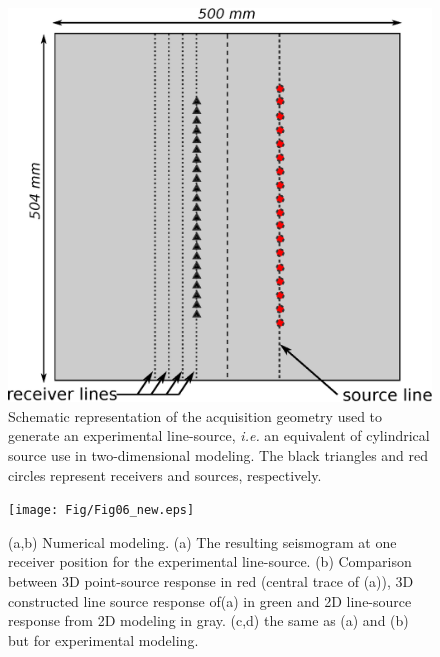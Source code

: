 \documentclass[extra,mreferee]{gji}
\newcommand{\bialt}{\textit{BiAlt} }
\begin{document}
\clearpage
\newpage


\clearpage
\newpage

\begin{figure}
\centering
\includegraphics[width=0.50\columnwidth]{Fig/Fig05.eps}
\caption{Schematic representation of the acquisition geometry used to generate an experimental line-source, \textit{i.e.} an equivalent of cylindrical source use in two-dimensional modeling. The black triangles and red circles represent receivers and sources, respectively.}
\label{Fig:Fig05}
\end{figure}

\clearpage
\newpage

\begin{figure}
\centering
\texttt{[image: Fig/Fig06\_new.eps]}
\caption{(a,b) Numerical modeling. (a) The resulting seismogram at one receiver position for the experimental line-source. (b) Comparison between 3D point-source response in red (central trace of (a)), 3D constructed line source response of(a) in green and 2D line-source response from 2D modeling in gray. (c,d) the same as (a) and (b) but for experimental modeling.}
\label{Fig:Fig06}
\end{figure}

\clearpage
\newpage
\end{document}
